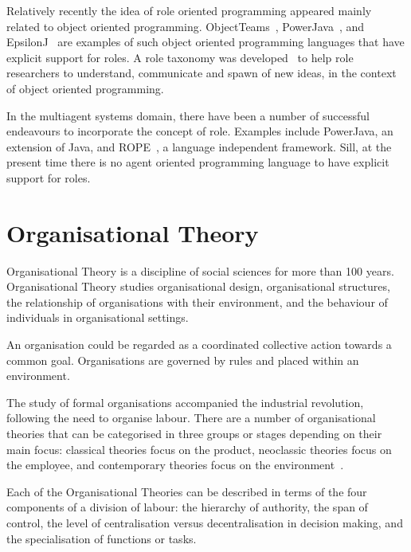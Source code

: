 \documentclass[a4paper,12pt,oneside,fleqn]{book} %
\begin{document}
Relatively recently the idea of role oriented programming appeared mainly
related to object oriented programming.
ObjectTeams~\cite{DBLP:journals/ao/Herrmann07},
PowerJava~\cite{DBLP:journals/entcs/BaldoniBT06}, and
EpsilonJ~\cite{DBLP:conf/snpd/MonpratarnchaiT08} are examples of such
object oriented programming languages that have explicit support for roles.
A role taxonomy was developed~\cite{graversen06nature} to help role
researchers to understand, communicate and spawn of new ideas, in the
context of object oriented programming.

In the multiagent systems domain, there have been a number of successful
endeavours to incorporate the concept of role. Examples include PowerJava,
an extension of Java, and ROPE~\cite{DBLP:conf/coopis/BechtGKM99}, a
language independent framework.  Sill, at the present time there is no
agent oriented programming language to have explicit support for roles.


\section{Organisational Theory}  %

Organisational Theory is a discipline of social sciences for more than 100
years. Organisational Theory studies organisational design, organisational
structures, the relationship of organisations with their environment, and
the behaviour of individuals in organisational settings.

An organisation could be regarded as a coordinated collective action
towards a common goal. Organisations are governed by rules and placed
within an environment.

The study of formal organisations accompanied the industrial
revolution, following the need to organise labour. There are a number of
organisational theories that can be categorised in three groups or stages
depending on their main focus: classical theories focus on the product,
neoclassic theories focus on the employee, and contemporary theories focus
on the environment~\cite{DohertySD01}.

Each of the Organisational Theories can be described in terms of the four
components of a division of labour: the hierarchy of authority, the span of
control, the level of centralisation versus decentralisation in decision
making, and the specialisation of functions or tasks.
\end{document}
